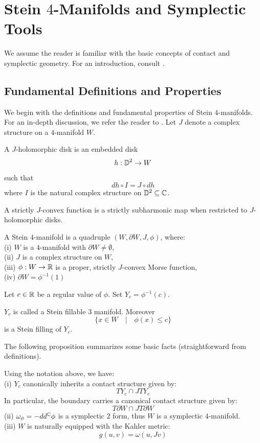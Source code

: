 \chapter{Stein $4$-Manifolds and Symplectic Tools}
We assume the reader is familiar with the basic concepts of contact and symplectic geometry. For an introduction, consult \cite{geiges2008contact}. 
\section{Fundamental Definitions and Properties}
We begin with the definitions and fundamental properties of Stein $4$-manifolds. 
For an in-depth discussion, we refer the reader to \cite{eliashberg2012stein}.
Let $J$ denote a complex structure on a $4$-manifold $W$.
\begin{defn}
A $J$-holomorphic disk is an embedded disk $$
h : \mathbb{D}^2 \rightarrow W
$$
such that 
$$ dh \circ I = J \circ dh
$$
where $I$ is the natural complex structure on $\mathbb{D}^2 \subseteq \mathbb{C}$.
\end{defn}
\begin{defn}
A strictly $J$-convex function is a strictly subharmonic map when restricted to $J$-holomorphic disks. 
\end{defn}
\begin{defn}
A Stein $4$-manifold is a quadruple $(W, \partial W, J, \phi)$, where: \\
(i) $W$ is a $4$-manifold with $\partial W \neq \emptyset$, \\
(ii) $J$ is a complex structure on $W$, \\
(iii) $\phi : W \rightarrow \mathbb{R}$ is a proper, strictly $J$-convex Morse function, \\
(iv) $\partial W = \phi^{-1}(1)$
\end{defn}
Let $c \in \mathbb{R}$ be a regular value of $\phi$. Set $Y_c = \phi^{-1}(c)$.
\begin{defn}
$Y_c$ is called a Stein fillable $3$ manifold. Moreover $$\{x \in W \quad | \quad \phi(x) \leq c \}$$
is a Stein filling of $Y_c$. 
\end{defn}
The following proposition summarizes some basic facts (straightforward from definitions).
\begin{prop} Using the notation above, we have: \\
(i) $Y_c$ canonically inherits a contact structure given by: $$
TY_c \cap JTY_c
$$
In particular, the boundary carries a canonical contact structure given by:
$$
T\partial W \cap J T \partial W
$$
(ii) $\omega_{\phi} = -dd^{\mathbb{C}}\phi$ is a symplectic $2$ form, thus $W$ is a symplectic $4$-manifold. \\
(iii) $W$ is naturally equipped with the Kahler metric: $$
g(u, v) = \omega(u, Jv)
$$
\end{prop}
